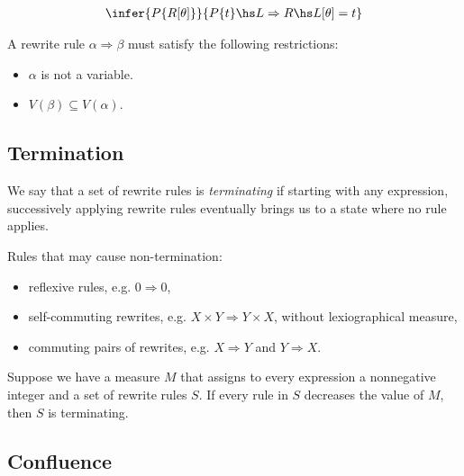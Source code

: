 \documentclass{article}
\begin{document}
\begin{theorem}
	\begin{align*}
		\infer{P\{R[\theta]\}}{P\{t\}\hs L\Rightarrow R\hs L[\theta]=t}
	\end{align*}
\end{theorem}

\begin{definition}
	A rewrite rule $\alpha\Rightarrow\beta$ must satisfy the following restrictions:
	\begin{itemize}
		\item $\alpha$ is not a variable.
		\item $V(\beta)\subseteq V(\alpha)$.
	\end{itemize}
\end{definition}

\subsection{Termination}

\begin{definition}
	We say that a set of rewrite rules is \emph{terminating} if starting with any expression,
	successively applying rewrite rules eventually brings us to a state where no rule applies.
\end{definition}

\begin{example}
	Rules that may cause non-termination:
	\begin{itemize}
		\item reflexive rules, e.g. $0\Rightarrow 0$,
		\item self-commuting rewrites, e.g. $X\times Y\Rightarrow Y\times X$, without lexiographical measure,
		\item commuting pairs of rewrites, e.g. $X \Rightarrow Y$ and $Y\Rightarrow X$.
	\end{itemize}
\end{example}

\begin{theorem}
	Suppose we have a measure $M$ that assigns to every expression a nonnegative integer and
	a set of rewrite rules $S$. If every rule in $S$ decreases the value of $M$, then $S$
	is terminating.
\end{theorem}

\subsection{Confluence}
\end{document}
